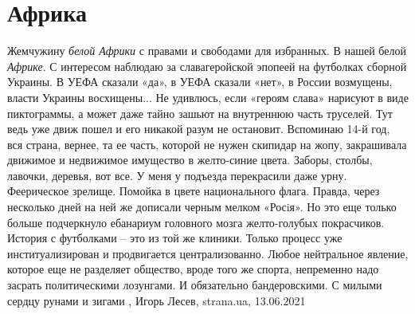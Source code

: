  
 
 
 
 
\chapter{Африка}
\label{sec:slova.afrika}

Жемчужину \emph{белой Африки} с правами и свободами для избранных.  В нашей
белой \emph{Африке}.  С интересом наблюдаю за славагеройской эпопеей на
футболках сборной Украины. В УЕФА сказали «да», в УЕФА сказали «нет», в России
возмущены, власти Украины восхищены... Не удивлюсь, если «героям слава» нарисуют
в виде пиктограммы, а может даже тайно зашьют на внутреннюю часть труселей. Тут
ведь уже движ пошел и его никакой разум не остановит.  Вспоминаю 14-й год, вся
страна, вернее, та ее часть, которой не нужен скипидар на жопу, закрашивала
движимое и недвижимое имущество в желто-синие цвета. Заборы, столбы, лавочки,
деревья, вот все. У меня у подъезда перекрасили даже урну. Феерическое зрелище.
Помойка в цвете национального флага. Правда, через несколько дней на ней же
дописали черным мелком «Росiя». Но это еще только больше подчеркнуло ебанариум
головного мозга желто-голубых покрасчиков. История с футболками – это из той
же клиники. Только процесс уже институализирован и продвигается
централизованно. Любое нейтральное явление, которое еще не разделяет общество,
вроде того же спорта, непременно надо засрать политическими лозунгами. И
обязательно бандеровскими. С милыми сердцу рунами и зигами
, 
Игорь Лесев, strana.ua, 13.06.2021

